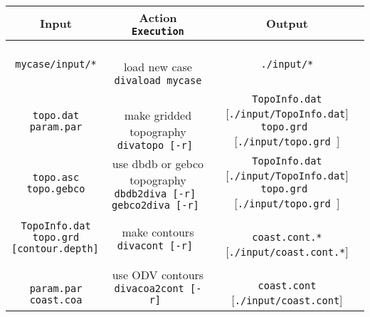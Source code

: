 \begin{table}[H]
{\scriptsize{
\begin{tabular}{c|c|c}
\toprule
{\Large{Input}} & \shortstack{\Large{{\sf Action}} \\
{\Large{{\tt Execution}}} } & {\Large{ Output}} \\ \midrule
{\tt mycase/input/*}  & 
\shortstack{ 
{  { }  } \\
{\sf load new case} \\
{\tt divaload mycase} } & {\tt ./input/*} \\ \hline
\shortstack{
{\tt topo.dat} \\
{\tt param.par}
}
 & 
\shortstack{
{  { }  } \\
{\sf make gridded topography} \\
{\tt divatopo [-r]  } 
\\
{  { }  }
}
& 
\shortstack{
{\tt TopoInfo.dat} { } [{\tt ./input/TopoInfo.dat}] \\
{\tt topo.grd }  { } [{\tt ./input/topo.grd }]
}
\\ \hline
 \shortstack{
{\tt topo.asc} \\
{\tt topo.gebco} 
}
 & 
\shortstack{
{\sf use dbdb or gebco topography} \\
{\tt dbdb2diva [-r]  } 
\\
{\tt gebco2diva [-r]  } 
}
& 
\shortstack{
{\tt TopoInfo.dat} { } [{\tt ./input/TopoInfo.dat}] \\
{\tt topo.grd }  { } [{\tt ./input/topo.grd }]
}
 \\ \hline
 \shortstack{
{\tt TopoInfo.dat} \\
{\tt topo.grd} \\
{\tt [contour.depth] }
}
 & 
\shortstack{
{\sf make contours} \\
{\tt divacont [-r]  } 
\\
{  { }  }
}
& 
\shortstack{
{  { }  } \\
{\tt coast.cont.*}  { } [{\tt ./input/coast.cont.*}] \\
{  { }  }
}
 \\ \hline
 \shortstack{
 {  { }  } \\
{\tt param.par} \\
{\tt coast.coa} 
}
 & 
\shortstack{
{\sf use ODV contours} \\
{\tt divacoa2cont [-r]  } 
\\
{  { }  }
}
& 
\shortstack{
{  { }  } \\
{\tt coast.cont}  { } [{\tt ./input/coast.cont}] \\
{  { }  }
}
 \\ \hline

\end{tabular}}}
\end{table}
